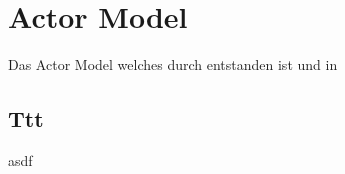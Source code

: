 \chapter{Actor Model}
Das Actor Model welches durch \cite{hewitt1973session} entstanden ist und in \cite{}
\section{Ttt}
asdf